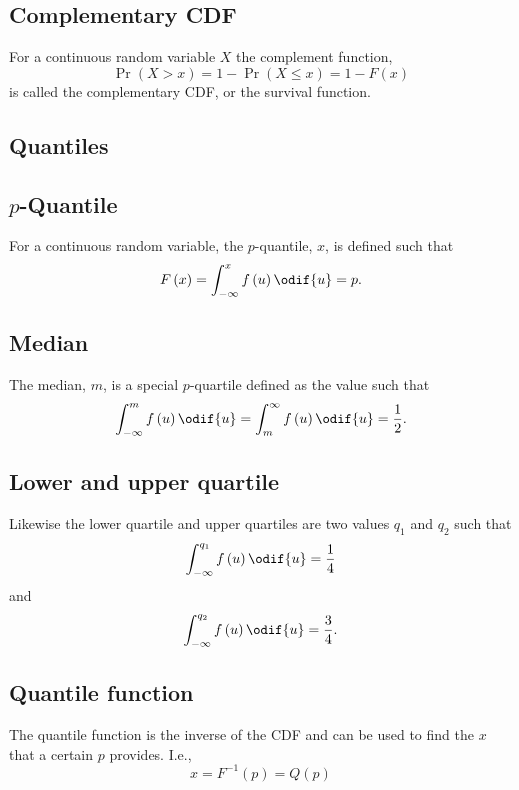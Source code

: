 \documentclass{article}
\begin{document}
\begin{multicols}{3}
    \subsection{Complementary CDF}
    For a continuous random variable \(X\) the complement function,
    \begin{equation*}
        \Pr{\left( X > x \right)} = 1 - \Pr{\left( X \leq x \right)} = 1 - F\left( x \right)
    \end{equation*}
    is called the complementary CDF, or the survival function.
    \subsection{Quantiles}
    \subsection{\(p\)-Quantile}
    For a continuous random variable, the \(p\)-quantile, \(x\), is defined such that
    \begin{equation*}
        F\left( x \right) = \int_{-\infty}^x f\left( u \right) \odif{u} = p.
    \end{equation*}
    \subsection{Median}
    The median, \(m\), is a special \(p\)-quartile defined as the value such that
    \begin{equation*}
        \int_{-\infty}^m f\left( u \right) \odif{u} = \int^{\infty}_m f\left( u \right) \odif{u} = \frac{1}{2}.
    \end{equation*}
    \subsection{Lower and upper quartile}
    Likewise the lower quartile and upper quartiles are two values \(q_1\) and \(q_2\) such that
    \begin{equation*}
        \int_{-\infty}^{q_1} f\left( u \right) \odif{u} = \frac{1}{4}
    \end{equation*}
    and
    \begin{equation*}
        \int_{-\infty}^{q_2} f\left( u \right) \odif{u} = \frac{3}{4}.
    \end{equation*}
    \subsection{Quantile function}
    The quantile function is the inverse of the CDF
    and can be used to find the \(x\) that a certain \(p\) provides. I.e.,
    \begin{equation*}
        x = F^{-1}\left( p \right) = Q\left( p \right)
    \end{equation*}

\end{multicols}
\end{document}
